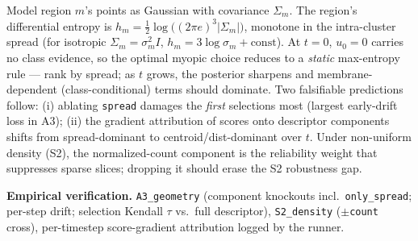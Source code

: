\begin{proposition}\label{prop:geom}
Model region $m$'s points as Gaussian with covariance $\Sigma_m$. The
region's differential entropy is
$h_m=\tfrac12\log\big((2\pi e)^3|\Sigma_m|\big)$, monotone in the
intra-cluster spread (for isotropic $\Sigma_m=\sigma_m^2 I$,
$h_m=3\log\sigma_m+\mathrm{const}$). At $t{=}0$, $u_0=0$ carries no class
evidence, so the optimal myopic choice reduces to a \emph{static}
max-entropy rule --- rank by spread; as $t$ grows, the posterior sharpens
and membrane-dependent (class-conditional) terms should dominate. Two
falsifiable predictions follow: (i) ablating \texttt{spread} damages the
\emph{first} selections most (largest early-drift loss in A3); (ii) the
gradient attribution of scores onto descriptor components shifts from
spread-dominant to centroid/dist-dominant over $t$. Under non-uniform
density (S2), the normalized-count component is the reliability weight that
suppresses sparse slices; dropping it should erase the S2 robustness gap.
\end{proposition}

\noindent\textbf{Empirical verification.} \texttt{A3\_geometry} (component
knockouts incl.\ \texttt{only\_spread}; per-step drift; selection Kendall
$\tau$ vs.\ full descriptor), \texttt{S2\_density} ($\pm$\texttt{count}
cross), per-timestep score-gradient attribution logged by the runner.

